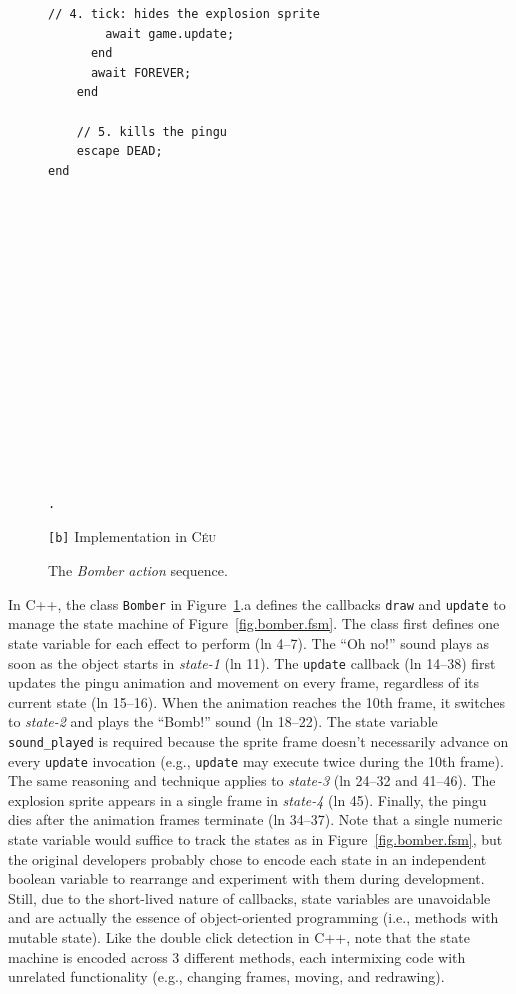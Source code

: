 \documentclass[times,twocolumn,final]{elsarticle}
\newcommand{\CEU}{\textsc{C\'{e}u}\xspace}
\newcommand{\code}[1] {{\small{\texttt{#1}}}}
\newcommand{\bx}{\code{[b]}\xspace}
\begin{document}
\begin{figure}
\begin{minipage}[t]{0.50\linewidth}
\begin{lstlisting}[xleftmargin=2em]
        // 4. tick: hides the explosion sprite
        await game.update;
      end
      await FOREVER;
    end

    // 5. kills the pingu
    escape DEAD;
end
















.
\end{lstlisting}
\centering\small{\bx Implementation in \CEU}
\end{minipage}
\caption{ The \emph{Bomber action} sequence.
\label{lst.bomber}
}
\end{figure}

In C++, the class \code{Bomber} in Figure~\ref{lst.bomber}.a defines the
callbacks \code{draw} and \code{update} to manage the state machine of
Figure~\ref{fig.bomber.fsm}.
%
The class first defines one state variable for each effect to perform
(ln 4--7).
The ``Oh no!'' sound plays as soon as the object starts in \emph{state-1} 
(ln 11).
The \code{update} callback (ln 14--38) first updates the pingu animation and
movement on every frame, regardless of its current state (ln 15--16).
When the animation reaches the 10th frame, it switches to \emph{state-2} and
plays the ``Bomb!'' sound (ln 18--22).
The state variable \code{sound\_played} is required because the sprite frame
doesn't necessarily advance on every \code{update} invocation (e.g.,
\code{update} may execute twice during the 10th frame).
The same reasoning and technique applies to \emph{state-3} (ln 24--32 and
41--46).
The explosion sprite appears in a single frame in \emph{state-4} (ln 45).
Finally, the pingu dies after the animation frames terminate (ln 34--37).
%
Note that a single numeric state variable would suffice to track the states as
in Figure~\ref{fig.bomber.fsm}, but the original developers probably chose to
encode each state in an independent boolean 
variable to rearrange and experiment with them during development.
Still, due to the short-lived nature of callbacks, state variables are 
unavoidable and are actually the essence of object-oriented programming
(i.e., methods with mutable state).
%
Like the double click detection in C++, note that the state machine is encoded
across 3 different methods, each intermixing code with unrelated functionality
(e.g., changing frames, moving, and redrawing).
\end{document}
